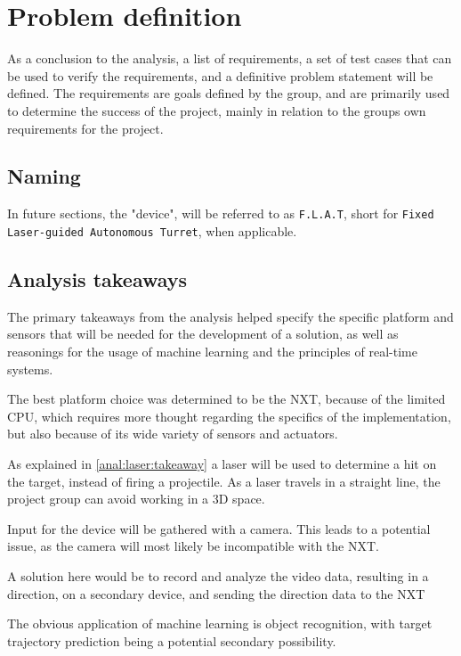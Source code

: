 \newpage
\section{Problem definition}
As a conclusion to the analysis, a list of requirements, a set of test cases that can be used to verify the requirements, and a definitive problem statement will be defined.
The requirements are goals defined by the group, and are primarily used to determine the success of the project, mainly in relation to the groups own requirements for the project.
\subsection{Naming}
In future sections, the "device", will be referred to as \texttt{F.L.A.T}, short for \texttt{Fixed Laser-guided Autonomous Turret}, when applicable.

\subsection{Analysis takeaways}
The primary takeaways from the analysis helped specify the specific platform and sensors that will be needed for the development of a solution, as well as reasonings for the usage of machine learning and the principles of real-time systems.

The best platform choice was determined to be the NXT, because of the limited CPU, which requires more thought regarding the specifics of the implementation, but also because of its wide variety of sensors and actuators.


As explained in \autoref{anal:laser:takeaway} a laser will be used to determine a hit on the target, instead of firing a projectile.
As a laser travels in a straight line, the project group can avoid working in a 3D space.


Input for the device will be gathered with a camera.
This leads to a potential issue, as the camera will most likely be incompatible with the NXT.

A solution here would be to record and analyze the video data, resulting in a direction, on a secondary device, and sending the direction data to the NXT

The obvious application of machine learning is object recognition, with target trajectory prediction being a potential secondary possibility.

